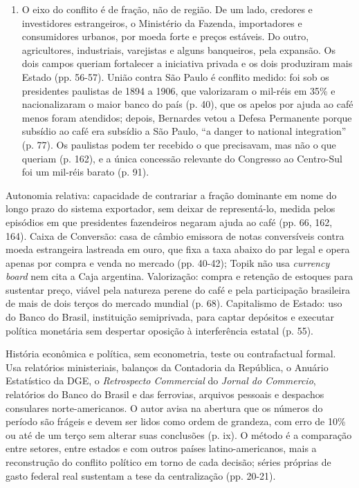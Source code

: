 \begin{enumerate}[leftmargin=*,nosep]
\item O eixo do conflito é de fração, não de região. De um lado, credores e
investidores estrangeiros, o Ministério da Fazenda, importadores e consumidores
urbanos, por moeda forte e preços estáveis. Do outro, agricultores, industriais,
varejistas e alguns banqueiros, pela expansão. Os dois campos queriam fortalecer
a iniciativa privada e os dois produziram mais Estado (pp. 56-57). União contra
São Paulo é conflito medido: foi sob os presidentes paulistas de 1894 a 1906, que
valorizaram o mil-réis em 35\% e nacionalizaram o maior banco do país (p. 40),
que os apelos por ajuda ao café menos foram atendidos; depois, Bernardes vetou a
Defesa Permanente porque subsídio ao café era subsídio a São Paulo, ``a danger to
national integration'' (p. 77). Os paulistas podem ter recebido o que precisavam,
mas não o que queriam (p. 162), e a única concessão relevante do Congresso ao
Centro-Sul foi um mil-réis barato (p. 91).
\end{enumerate}

Autonomia relativa: capacidade de contrariar a fração dominante em nome do longo
prazo do sistema exportador, sem deixar de representá-lo, medida pelos episódios
em que presidentes fazendeiros negaram ajuda ao café (pp. 66, 162, 164). Caixa de
Conversão: casa de câmbio emissora de notas conversíveis contra moeda estrangeira
lastreada em ouro, que fixa a taxa abaixo do par legal e opera apenas por compra
e venda no mercado (pp. 40-42); Topik não usa \emph{currency board} nem cita a
Caja argentina. Valorização: compra e retenção de estoques para sustentar preço,
viável pela natureza perene do café e pela participação brasileira de mais de
dois terços do mercado mundial (p. 68). Capitalismo de Estado: uso do Banco do
Brasil, instituição semiprivada, para captar depósitos e executar política
monetária sem despertar oposição à interferência estatal (p. 55).

História econômica e política, sem econometria, teste ou contrafactual formal.
Usa relatórios ministeriais, balanços da Contadoria da República, o Anuário
Estatístico da DGE, o \emph{Retrospecto Commercial} do \emph{Jornal do
Commercio}, relatórios do Banco do Brasil e das ferrovias, arquivos pessoais e
despachos consulares norte-americanos. O autor avisa na abertura que os números
do período são frágeis e devem ser lidos como ordem de grandeza, com erro de
10\% ou até de um terço sem alterar suas conclusões (p. ix). O método é a
comparação entre setores, entre estados e com outros países latino-americanos,
mais a reconstrução do conflito político em torno de cada decisão; séries
próprias de gasto federal real sustentam a tese da centralização (pp. 20-21).


